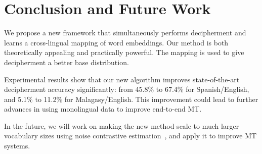 \section{Conclusion and Future Work}


We propose a new framework that simultaneously performs decipherment and learns a cross-lingual mapping of word embeddings. Our method is both theoretically appealing and practically powerful. The mapping is used to give decipherment a better base distribution. 

Experimental results show that our new algorithm improves state-of-the-art decipherment accuracy significantly: from 45.8\% to 67.4\% for Spanish/English, and 5.1\% to 11.2\% for Malagasy/English. This improvement could lead to further advances in using monolingual data to improve end-to-end MT.

In the future, we will work on making the new method scale to much larger vocabulary sizes using noise contrastive estimation~\cite{gutmann2010noise}, and apply it to improve MT systems.